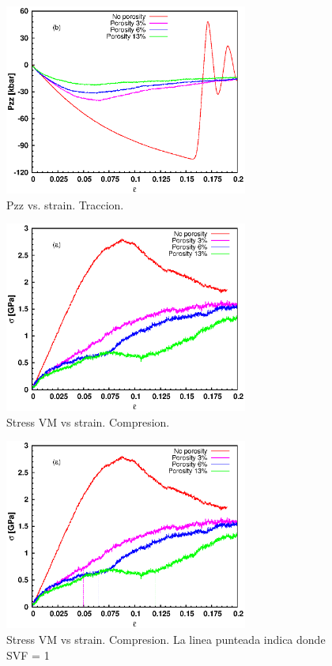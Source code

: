 \documentclass[10pt, oneside]{article} %
\begin{document}
\begin{figure}[H]
\centering
\includegraphics[width=8cm]{Figures/Porosidad/porosity_Pzz_strain_tens.eps}
\caption{Pzz vs. strain. Traccion.}
\end{figure}


\begin{figure}[H]
\centering
\includegraphics[width=8cm]{Figures/Porosidad/porosity_stress_strain_comp.eps}
\caption{Stress VM vs strain. Compresion.}
\end{figure}

\begin{figure}[H]
\centering
\includegraphics[width=8cm]{Figures/Porosidad/porosity_stress_strain_comp_dash.eps}
\caption{Stress VM vs strain. Compresion. La linea punteada indica donde SVF = 1}
\end{figure}
\end{document}
